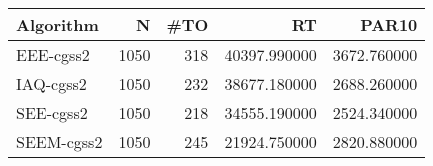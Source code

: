 \begin{tabular}{lrrrr}
\toprule
Algorithm & N & #TO & RT & PAR10 \\
\midrule
EEE-cgss2 & 1050 & 318 & 40397.990000 & 3672.760000 \\
IAQ-cgss2 & 1050 & 232 & 38677.180000 & 2688.260000 \\
SEE-cgss2 & 1050 & 218 & 34555.190000 & 2524.340000 \\
SEEM-cgss2 & 1050 & 245 & 21924.750000 & 2820.880000 \\
\bottomrule
\end{tabular}
